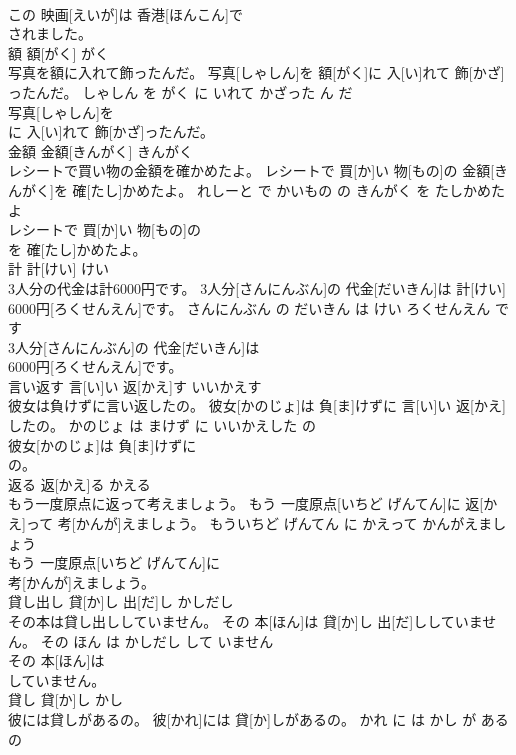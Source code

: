 \documentclass[8pt]{extreport}
\begin{document}
\begin{CJK}{UTF8}{min}
\\	この 映画[えいが]は 香港[ほんこん]で
\\	されました。			
\\	額	額[がく]	がく	
\\	写真を額に入れて飾ったんだ。	写真[しゃしん]を 額[がく]に 入[い]れて 飾[かざ]ったんだ。	しゃしん を がく に いれて かざった ん だ	
\\	写真[しゃしん]を
\\	に 入[い]れて 飾[かざ]ったんだ。			
\\	金額	金額[きんがく]	きんがく	
\\	レシートで買い物の金額を確かめたよ。	レシートで 買[か]い 物[もの]の 金額[きんがく]を 確[たし]かめたよ。	れしーと で かいもの の きんがく を たしかめた よ	
\\	レシートで 買[か]い 物[もの]の
\\	を 確[たし]かめたよ。			
\\	計	計[けい]	けい	
\\	3人分の代金は計6000円です。	3人分[さんにんぶん]の 代金[だいきん]は 計[けい] 6000円[ろくせんえん]です。	さんにんぶん の だいきん は けい ろくせんえん です	
\\	3人分[さんにんぶん]の 代金[だいきん]は
\\	6000円[ろくせんえん]です。			
\\	言い返す	言[い]い 返[かえ]す	いいかえす	
\\	彼女は負けずに言い返したの。	彼女[かのじょ]は 負[ま]けずに 言[い]い 返[かえ]したの。	かのじょ は まけず に いいかえした の	
\\	彼女[かのじょ]は 負[ま]けずに
\\	の。			
\\	返る	返[かえ]る	かえる	
\\	もう一度原点に返って考えましょう。	もう 一度原点[いちど げんてん]に 返[かえ]って 考[かんが]えましょう。	もういちど げんてん に かえって かんがえましょう	
\\	もう 一度原点[いちど げんてん]に
\\	考[かんが]えましょう。			
\\	貸し出し	貸[か]し 出[だ]し	かしだし	
\\	その本は貸し出ししていません。	その 本[ほん]は 貸[か]し 出[だ]ししていません。	その ほん は かしだし して いません	
\\	その 本[ほん]は
\\	していません。			
\\	貸し	貸[か]し	かし	
\\	彼には貸しがあるの。	彼[かれ]には 貸[か]しがあるの。	かれ に は かし が ある の	

\end{CJK}
\end{document}
